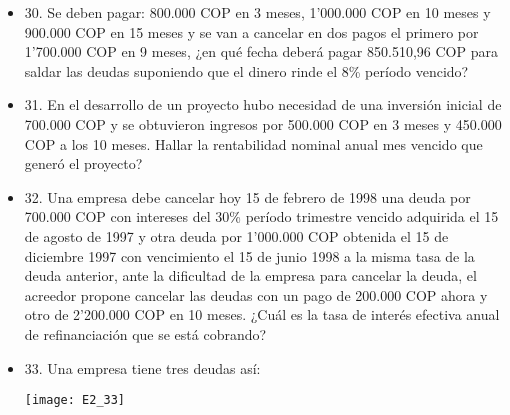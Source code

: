 \begin{itemize}
 \item 30. Se deben pagar: 800.000 COP en 3 meses, 1'000.000 COP en 10 meses y 900.000 COP en 15 meses y se van a cancelar en dos pagos el primero por 1'700.000 COP en 9 meses,  ¿en qué fecha deberá pagar 850.510,96 COP para saldar las deudas suponiendo que el dinero rinde el 8\% período vencido?
       \medskip

 \item 31. En el desarrollo de un proyecto hubo necesidad de una inversión inicial de 700.000 COP y se obtuvieron ingresos por 500.000 COP en 3 meses y 450.000 COP a los 10 meses. Hallar la rentabilidad nominal anual mes vencido que generó el proyecto?\\
       \medskip

 \item 32. Una empresa debe cancelar hoy 15 de febrero de 1998 una deuda por 700.000 COP con intereses del 30\% período trimestre vencido adquirida el 15 de agosto de 1997 y otra deuda por 1'000.000 COP obtenida el 15 de diciembre 1997 con vencimiento el 15 de junio 1998 a la misma tasa de la deuda anterior, ante la dificultad de la empresa para cancelar la deuda, el acreedor propone cancelar las deudas con un pago de 200.000 COP ahora y otro de 2'200.000 COP en 10 meses. ¿Cuál es la tasa de interés efectiva anual de refinanciación que se está cobrando?\\
       \medskip

 \item 33. Una empresa tiene tres deudas así:
       \begin{center}
        \texttt{[image: E2\_33]}
       \end{center}

\end{itemize}